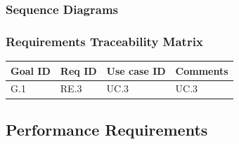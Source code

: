 \documentclass[12pt]{article}
\begin{document}
\subsubsection{Sequence Diagrams}

\subsubsection{Requirements Traceability Matrix}
\begin{tabular}{ | l | l | l | l |}
    \hline
    \textbf{Goal ID} & \textbf{Req ID} & \textbf{Use case ID} & \textbf{Comments} \\ \hline
    G.1 & RE.3 & UC.3 & UC.3 \\ \hline
\end{tabular}

\subsection{Performance Requirements}
\end{document}
